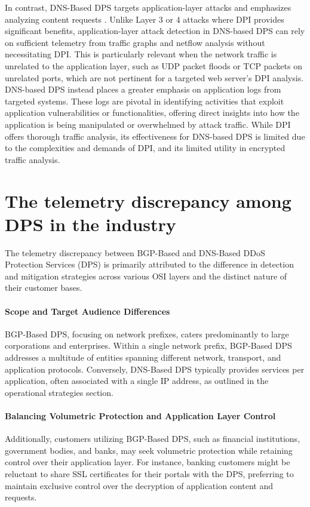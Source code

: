 In contrast, DNS-Based DPS targets application-layer attacks and emphasizes analyzing content requests \cite{xie2008monitoring}. Unlike Layer 3 or 4 attacks where DPI provides significant benefits, application-layer attack detection in DNS-based DPS can rely on sufficient telemetry from traffic graphs and netflow analysis without necessitating DPI. This is particularly relevant when the network traffic is unrelated to the application layer, such as UDP packet floods or TCP packets on unrelated ports, which are not pertinent for a targeted web server's DPI analysis. DNS-based DPS instead places a greater emphasis on application logs from targeted systems. These logs are pivotal in identifying activities that exploit application vulnerabilities or functionalities, offering direct insights into how the application is being manipulated or overwhelmed by attack traffic. While DPI offers thorough traffic analysis, its effectiveness for DNS-based DPS is limited due to the complexities and demands of DPI, and its limited utility in encrypted traffic analysis.



\section{The telemetry discrepancy among DPS in the industry}\label{sec:telemetry}
The telemetry discrepancy between BGP-Based and DNS-Based DDoS Protection Services (DPS) is primarily attributed to the difference in detection and mitigation strategies across various OSI layers and the distinct nature of their customer bases. 
\paragraph{Scope and Target Audience Differences} BGP-Based DPS, focusing on network prefixes, caters predominantly to large corporations and enterprises. Within a single network prefix, BGP-Based DPS addresses a multitude of entities spanning different network, transport, and application protocols. Conversely, DNS-Based DPS typically provides services per application, often associated with a single IP address, as outlined in the operational strategies section. 

\paragraph{Balancing Volumetric Protection and Application Layer Control} Additionally, customers utilizing BGP-Based DPS, such as financial institutions, government bodies, and banks, may seek volumetric protection while retaining control over their application layer. For instance, banking customers might be reluctant to share SSL certificates for their portals with the DPS, preferring to maintain exclusive control over the decryption of application content and requests.
